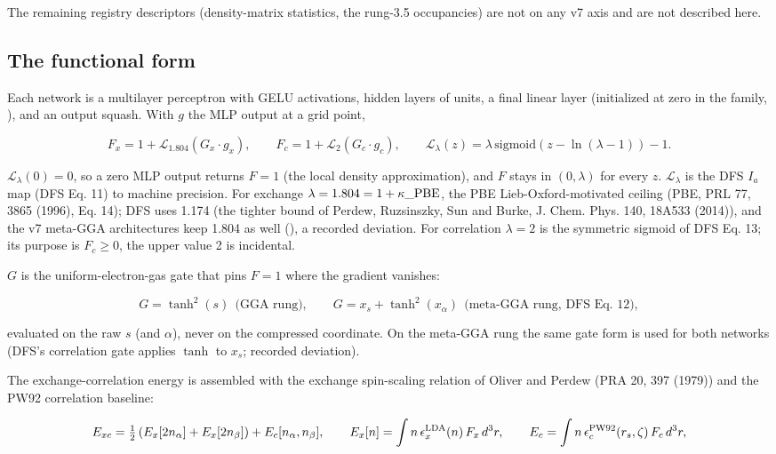 \documentclass[10pt,a4paper]{article}
\begin{document}
The remaining registry descriptors (density-matrix statistics, the rung-3.5 occupancies) are
not on any v7 axis and are not described here.

\subsection{The functional form}

Each network is a multilayer perceptron with GELU activations,  hidden layers of 
units, a final linear layer (initialized at zero in the  family,
), and an output squash.
With $g$ the MLP output at a grid point,

\[
F_x = 1 + \mathcal{L}_{1.804}\!\left(G_x \cdot g_x\right), \qquad
F_c = 1 + \mathcal{L}_{2}\!\left(G_c \cdot g_c\right), \qquad
\mathcal{L}_{\lambda}(z) = \lambda\,\mathrm{sigmoid}\!\left(z - \ln(\lambda - 1)\right) - 1.
\]

$\mathcal{L}_\lambda(0) = 0$, so a zero MLP output returns $F = 1$ (the local density
approximation), and $F$ stays in $(0, \lambda)$ for every $z$. $\mathcal{L}_\lambda$ is the
DFS $I_a$ map (DFS Eq. 11) to machine precision. For exchange $\lambda = 1.804 = 1 +
\kappa\_{\rm PBE}$, the PBE Lieb-Oxford-motivated ceiling (PBE, PRL 77, 3865 (1996), Eq. 14);
DFS uses 1.174 (the tighter bound of Perdew, Ruzsinszky, Sun and Burke, J. Chem. Phys. 140,
18A533 (2014)), and the v7 meta-GGA architectures keep 1.804 as well
(), a recorded deviation. For correlation $\lambda = 2$ is the
symmetric sigmoid of DFS Eq. 13; its purpose is $F_c \ge 0$, the upper value 2 is incidental.

$G$ is the uniform-electron-gas gate that pins $F = 1$ where the gradient vanishes:

\[
G = \tanh^2(s) \ \ \text{(GGA rung)}, \qquad
G = x_s + \tanh^2(x_\alpha) \ \ \text{(meta-GGA rung, DFS Eq. 12)},
\]

evaluated on the raw $s$ (and $\alpha$), never on the compressed coordinate. On the meta-GGA
rung the same gate form is used for both networks (DFS's correlation gate applies $\tanh$ to
$x_s$; recorded deviation).

The exchange-correlation energy is assembled with the exchange spin-scaling relation of
Oliver and Perdew (PRA 20, 397 (1979)) and the PW92 correlation baseline:

\[
E_{xc} = \tfrac12\left(E_x[2 n_\alpha] + E_x[2 n_\beta]\right) + E_c[n_\alpha, n_\beta], \qquad
E_x[n] = \int n\, \epsilon_x^{\rm LDA}(n)\, F_x\, d^3r, \qquad
E_c = \int n\, \epsilon_c^{\rm PW92}(r_s, \zeta)\, F_c\, d^3r,
\]
\end{document}
